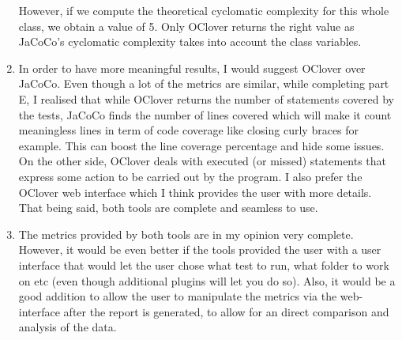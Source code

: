 \begin{enumerate}[label={\alph*)}]
    \noindent However, if we compute the theoretical cyclomatic complexity for this whole class, we obtain a value of 5. Only OClover returns the right value as JaCoCo's cyclomatic complexity takes into account the class variables.
    \item In order to have more meaningful results, I would suggest OClover over JaCoCo. Even though a lot of the metrics are similar, while completing part E, I realised that while OClover returns the number of statements covered by the tests, JaCoCo finds the number of lines covered which will make it count meaningless lines in term of code coverage like closing curly braces for example. This can boost the line coverage percentage and hide some issues. On the other side, OClover deals with executed (or missed) statements that express some action to be carried out by the program. I also prefer the OClover web interface which I think provides the user with more details. That being said, both tools are complete and seamless to use. 
    \item The metrics provided by both tools are in my opinion very complete. However, it would be even better if the tools provided the user with a user interface that would let the user chose what test to run, what folder to work on etc (even though additional plugins will let you do so). Also, it would be a good addition to allow the user to manipulate the metrics via the web-interface after the report is generated, to allow for an direct comparison and analysis of the data. 
\end{enumerate}